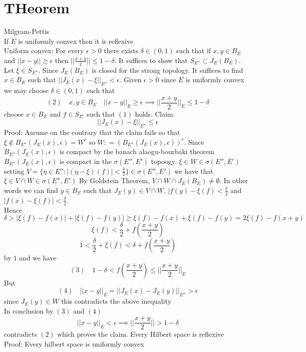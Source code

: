 \documentclass[11pt]{article}
\begin{document}
\section{THeorem} Milgram-Pettis\\
If $E$ is uniformly convex then it is reflexive\\
Uniform convex:
For every  $\epsilon > 0$ there exists $\delta \in (0,1)$ such that if $x,y \in B_E$ and  $||x-y|| \ge \epsilon$ then
$|| \frac{x + y}{2} || \le  1 -\delta$.
It suffices to show that $S_{E''} \subset J_E(B_E)$. Let $\xi \in S_{E''}$. Since  $J_E(B_E)$ is closed for the 
strong topology. It suffices to find  $x \in B_E$ such that
$||J_E(x) - \xi||_{E''} < \epsilon$.
Given $\epsilon> 0$ since $E$ is uniformly convex we may choose  $\delta \in (0,1)$ such that
\[
    (2) \quad x,y \in B_E \quad ||x-y||_E \ge \epsilon \implies || \frac{x+y}{2}||_{E} \le 1- \delta
\] 
choose $x \in B_E$ and  $f \in S_{E'}$ such that $(1)$ holds.
Claim:
\[
    ||J_E(x) - \xi||_{E''} \le \epsilon
\] 
Proof: Assume on the contrary that the claim fails so that
$\xi \not\in B_{E''}(J_E(x), \epsilon) = W^{c}$   so $W : = (B_{E''}(J_E(x),\epsilon))^{c}$.
Since $B_{E''}(J_E(x),\epsilon)$ is compact by the banach alaogu-bourbaki theorem $B_{E''}(J_E(x), \epsilon)$ is compact in the $\sigma(E'',E')$ topoogy.
$\xi \in W \in \sigma(E'',E')$ setting $V = \{ \eta \in E'': |(\eta - \xi)(f)| < \frac{\delta}{2} \} \in \sigma(E'', E')$ we have that $\xi \in V \cap W \in \sigma(E'',E')$
By Goldstein Theorem, $V \cap W \cap J_E(B_E) \ne \emptyset$. In other words we can find  $y \in B_E$ such that  $J_E(y) \in V \cap W$.
 $|f(y) - \xi(f) < \frac{\delta}{2}$ and $|f(x) - \xi(f)| < \frac{\delta}{2}$.\\
Hence 
 \[
\delta > |\xi(f) - f(x)| + |\xi(f) - f(y)| \ge \xi(f) - f(x) + \xi(f) - f(y) = 2\xi(f) - f(x+y)
\] 
\[
\xi(f) < \frac{\delta}{2} + f( \frac{x+y}{2})
\] 
 \[
     1< \frac{\delta}{2} + \xi(f) < \delta + f( \frac{x+y}{2})
\] 
by $1$ and we have
\[
    (3) \quad   1 - \delta < f( \frac{x+y}{2}) \le ||\frac{x+y}{2}||_{E}
\] 
But
\[
    (4) \quad    ||x-y||_E = ||J_E(x) - J_E(y)||_{E''} > \epsilon
\] 
since $J_E(y) \in W$ this contradicts the above inequality\\
In conclusion by $(3)$ and  $(4)$
 \[
||x-y||_E < \epsilon \implies ||\frac{x+y}{2}|| > 1 - \delta
\] 
contradicts $(2)$ which proves the claim.
Every Hilbert space is reflexive\\
Proof: Every hilbert space is uniformly convex
\end{document}

